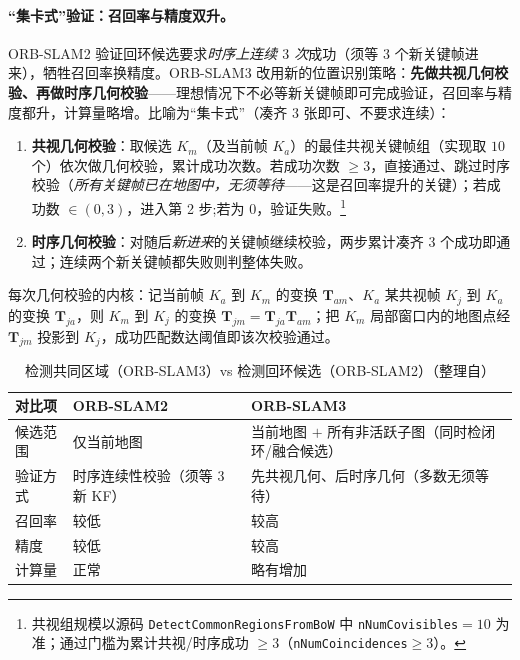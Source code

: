 \paragraph{“集卡式”验证：召回率与精度双升。}
ORB-SLAM2 验证回环候选要求\emph{时序上连续 $3$ 次}成功（须等 $3$ 个新关键帧进来），牺牲召回率换精度。ORB-SLAM3 改用新的位置识别策略\cite{campos2021orbslam3}：\textbf{先做共视几何校验、再做时序几何校验}——理想情况下不必等新关键帧即可完成验证，召回率与精度都升，计算量略增。比喻为“集卡式”（凑齐 $3$ 张即可、不要求连续）：
\begin{enumerate}
  \item \textbf{共视几何校验}：取候选 $K_m$（及当前帧 $K_a$）的最佳共视关键帧组（实现取 $10$ 个）依次做几何校验，累计成功次数。若成功次数 $\ge 3$，直接通过、跳过时序校验（\emph{所有关键帧已在地图中，无须等待}——这是召回率提升的关键）；若成功数 $\in(0,3)$，进入第 2 步;若为 $0$，验证失败。\footnote{共视组规模以源码 \texttt{DetectCommonRegionsFromBoW} 中 \texttt{nNumCovisibles}$=10$ 为准；通过门槛为累计共视/时序成功 $\ge 3$（\texttt{nNumCoincidences}$\ge 3$）。}
  \item \textbf{时序几何校验}：对随后\emph{新进来}的关键帧继续校验，两步累计凑齐 $3$ 个成功即通过；连续两个新关键帧都失败则判整体失败。
\end{enumerate}
每次几何校验的内核：记当前帧 $K_a$ 到 $K_m$ 的变换 $\mathbf{T}_{am}$、$K_a$ 某共视帧 $K_j$ 到 $K_a$ 的变换 $\mathbf{T}_{ja}$，则 $K_m$ 到 $K_j$ 的变换 $\mathbf{T}_{jm}=\mathbf{T}_{ja}\mathbf{T}_{am}$；把 $K_m$ 局部窗口内的地图点经 $\mathbf{T}_{jm}$ 投影到 $K_j$，成功匹配数达阈值即该次校验通过。

\begin{table}[H]\centering\small
\caption{检测共同区域（ORB-SLAM3）vs 检测回环候选（ORB-SLAM2）（整理自\cite{campos2021orbslam3}）}
\label{tab:vio-commonregion}
\begin{tabular}{lll}
\toprule
对比项 & ORB-SLAM2 & ORB-SLAM3 \\
\midrule
候选范围 & 仅当前地图 & 当前地图 $+$ 所有非活跃子图（同时检闭环/融合候选） \\
验证方式 & 时序连续性校验（须等 $3$ 新 KF） & 先共视几何、后时序几何（多数无须等待） \\
召回率 & 较低 & 较高 \\
精度 & 较低 & 较高 \\
计算量 & 正常 & 略有增加 \\
\bottomrule
\end{tabular}
\end{table}

